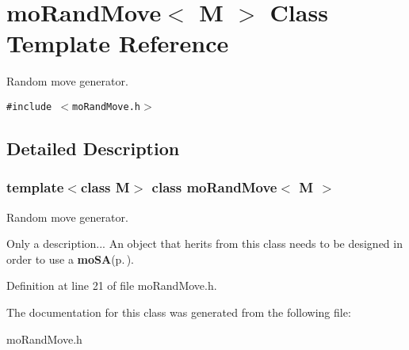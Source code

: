 \section{mo\-Rand\-Move$<$ M $>$ Class Template Reference}
\label{classmo_rand_move}
Random move generator.  


{\tt \#include $<$mo\-Rand\-Move.h$>$}



\subsection{Detailed Description}
\subsubsection*{template$<$class M$>$ class mo\-Rand\-Move$<$ M $>$}

Random move generator. 

Only a description... An object that herits from this class needs to be designed in order to use a {\bf mo\-SA}{\rm (p.\,\pageref{classmo_s_a})}. 



Definition at line 21 of file mo\-Rand\-Move.h.

The documentation for this class was generated from the following file:\begin{CompactItemize}
\item 
mo\-Rand\-Move.h\end{CompactItemize}
